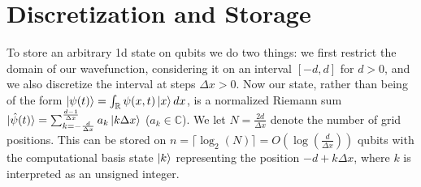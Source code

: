 \documentclass[10pt]{article}
\begin{document}
\section*{Discretization and Storage}
To store an arbitrary 1d state on qubits we do two things: we first restrict the domain of our wavefunction,
considering it on an interval $[-d, d]$ for $d > 0$, and we also discretize the
interval at steps $\Delta x > 0$. Now our state, rather than being of the form
$\ket{\psi(t)} = \int_{\mathbb{R}} \psi(x, t) \ket{x} dx$, is a normalized
Riemann sum $\ket{\hat{\psi}(t)} = \sum_{k = -\frac{d}{\Delta x}}^{\frac{d-1}{\Delta x}} a_k \ket{k \Delta x}$
($a_k \in \mathbb{C}$). We let $N = \frac{2d}{\Delta x}$ denote the number of grid positions.
This can be stored on $n = \lceil \log_2\left(N\right) \rceil = O\left(\log \left(\frac{d}{\Delta x} 
\right) \right)$ qubits with the computational basis state $\ket{k}$ representing
the position $-d + k \Delta x$, where $k$ is interpreted as an unsigned integer.
\end{document}
